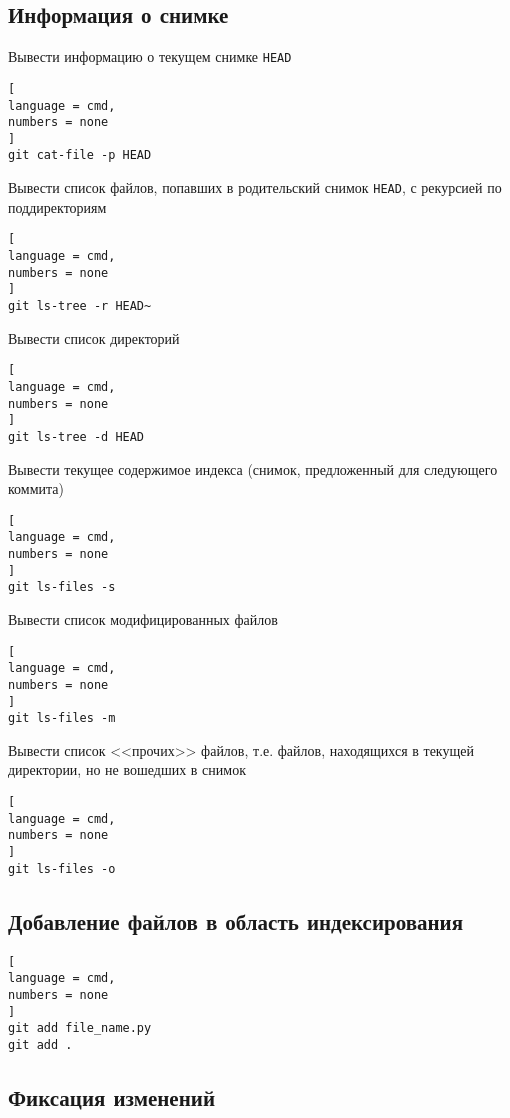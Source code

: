 \documentclass[%
	11pt,
	a4paper,
	utf8,
		]{article}
\begin{document}
\subsection{Информация о снимке}

Вывести информацию о текущем снимке \texttt{HEAD}
\begin{lstlisting}[
language = cmd,
numbers = none
]
git cat-file -p HEAD
\end{lstlisting}

Вывести список файлов, попавших в родительский снимок \texttt{HEAD}, с рекурсией по поддиректориям
\begin{lstlisting}[
language = cmd,
numbers = none
]
git ls-tree -r HEAD~
\end{lstlisting}

Вывести список директорий
\begin{lstlisting}[
language = cmd,
numbers = none
]
git ls-tree -d HEAD
\end{lstlisting}

Вывести текущее содержимое индекса (снимок, предложенный для следующего коммита)
\begin{lstlisting}[
language = cmd,
numbers = none
]
git ls-files -s
\end{lstlisting}

Вывести список модифицированных файлов
\begin{lstlisting}[
language = cmd,
numbers = none
]
git ls-files -m
\end{lstlisting}

Вывести список <<прочих>> файлов, т.е. файлов, находящихся в текущей директории, но не вошедших в снимок
\begin{lstlisting}[
language = cmd,
numbers = none
]
git ls-files -o
\end{lstlisting}


\subsection{Добавление файлов в область индексирования}

\begin{lstlisting}[
language = cmd,
numbers = none
]
git add file_name.py
git add .
\end{lstlisting}


\subsection{Фиксация изменений}
\end{document}
